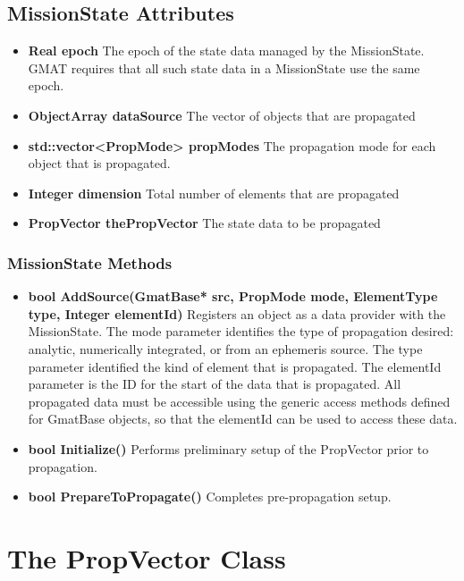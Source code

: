 \subsection{MissionState Attributes}

\begin{itemize}
\item\textbf{Real epoch} The epoch of the state data managed by the MissionState.  GMAT requires
that all such state data in a MissionState use the same epoch.
\item\textbf{ObjectArray dataSource} The vector of objects that are propagated
\item\textbf{std::vector<PropMode> propModes} The propagation mode for each object that is
propagated.
\item\textbf{Integer dimension} Total number of elements that are propagated
\item\textbf{PropVector thePropVector} The state data to be propagated
\end{itemize}

\subsubsection{MissionState Methods}

\begin{itemize}
\item\textbf{bool AddSource(GmatBase* src, PropMode mode, ElementType type, Integer elementId)}
Registers an object as a data provider with the MissionState.  The mode parameter identifies the
type of propagation desired: analytic, numerically integrated, or from an ephemeris source.  The
type parameter identified the kind of element that is propagated.  The elementId parameter is the ID
for the start of the data that is propagated.  All propagated data must be accessible using the
generic access methods defined for GmatBase objects, so that the elementId can be used to access
these data.
\item\textbf{bool Initialize()}  Performs preliminary setup of the PropVector prior to propagation.
\item \textbf{bool PrepareToPropagate()}  Completes pre-propagation setup.
\end{itemize}

\section{\label{section:propVector}The PropVector Class}

